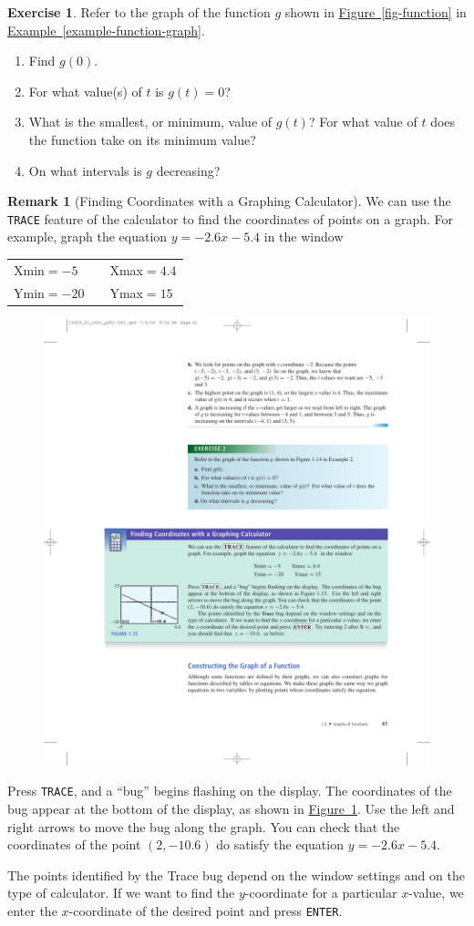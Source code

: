 \documentclass[10pt,]{book}
\theoremstyle{plain}
\theoremstyle{definition}
\newtheorem{remark}[theorem]{Remark}
\theoremstyle{definition}
\theoremstyle{definition}
\theoremstyle{definition}
\newtheorem{exercise}[theorem]{Exercise}
\numberwithin{equation}{part}
\begin{document}
\begin{exercise}\label{exercise-function-graph}
Refer to the graph of the function \(g\) shown in \hyperref[fig-function]{Figure~\ref{fig-function}} in \hyperref[example-function-graph]{Example~\ref{example-function-graph}}. \leavevmode%
\begin{enumerate}[label=*\alph**]
\item\hypertarget{li-613}{}Find \(g(0)\).%
\item\hypertarget{li-614}{}For what value(s) of \(t\) is \(g(t) = 0\)?%
\item\hypertarget{li-615}{}What is the smallest, or minimum, value of \(g(t)\)? For what value of \(t\) does the function take on its minimum value?%
\item\hypertarget{li-616}{}On what intervals is \(g\) decreasing?%
\end{enumerate}
\end{exercise}
\begin{remark}[Finding Coordinates with a Graphing Calculator]\label{remark-5}
We can use the \lstinline?TRACE? feature of the calculator to find the coordinates of points on a graph. For example, graph the equation \(y = -2.6x - 5.4\) in the window%
\begin{table}
\centering
\begin{tabular}{lll}
Xmin\(=-5\)&&Xmax\(=4.4\)\tabularnewline[0pt]
Ymin\(=-20\)&&Ymax\(=15\)
\end{tabular}
\end{table}
\begin{figure}
\centering
\includegraphics[width=0.6\linewidth]{images/fig-GC-trace}
\caption{\label{fig-GC-trace}}
\end{figure}
Press \lstinline?TRACE?, and a “bug” begins flashing on the display. The coordinates of the bug appear at the bottom of the display, as shown in \hyperref[fig-GC-trace]{Figure~\ref{fig-GC-trace}}. Use the left and right arrows to move the bug along the graph. You can check that the coordinates of the point \((2, -10.6)\) do satisfy the equation \(y = -2.6x - 5.4\).%
\par
The points identified by the Trace bug depend on the window settings and on the type of calculator. If we want to find the \(y\)-coordinate for a particular \(x\)-value, we enter the \(x\)-coordinate of the desired point and press \lstinline?ENTER?.%
\end{remark}
\end{document}
